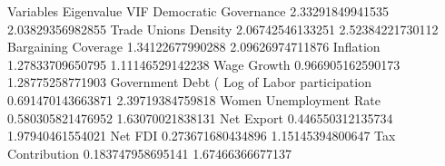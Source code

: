Variables	Eigenvalue	VIF
Democratic Governance	2.33291849941535	2.03829356982855
Trade Unions Density	2.06742546133251	2.52384221730112
Bargaining Coverage	1.34122677990288	2.09626974711876
Inflation	1.27833709650795	1.11146529142238
Wage Growth	0.966905162590173	1.28775258771903
Government Debt (%
Log of Labor participation	0.691470143663871	2.39719384759818
Women Unemployment Rate	0.580305821476952	1.63070021838131
Net Export	0.446550312135734	1.97940461554021
Net FDI	0.273671680434896	1.15145394800647
Tax Contribution	0.183747958695141	1.67466366677137

